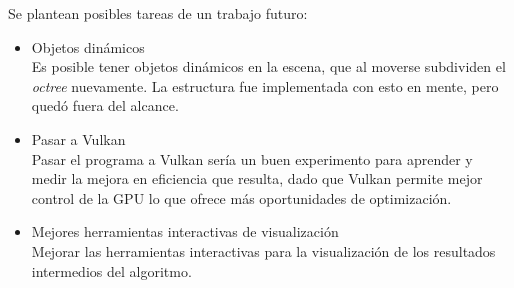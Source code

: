 Se plantean posibles tareas de un trabajo futuro:
\begin{itemize}
    \item Objetos dinámicos\\
        Es posible tener objetos dinámicos en la escena, que al moverse subdividen el \textit{octree} nuevamente.
        La estructura fue implementada con esto en mente, pero quedó fuera del alcance.
    \item Pasar a Vulkan\\
        Pasar el programa a Vulkan sería un buen experimento para aprender y medir la mejora en eficiencia que resulta, dado que Vulkan permite mejor control de la GPU lo que ofrece más oportunidades de optimización.
    \item Mejores herramientas interactivas de visualización\\
        Mejorar las herramientas interactivas para la visualización de los resultados intermedios del algoritmo.
\end{itemize}

